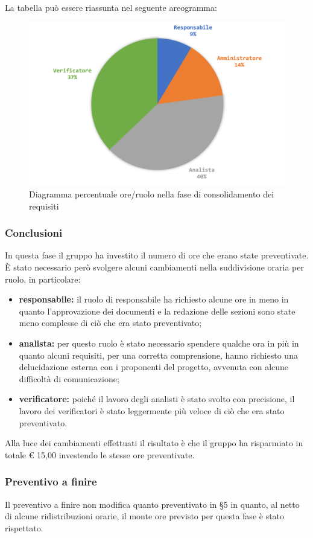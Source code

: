			La tabella può essere riassunta nel seguente areogramma:
			\begin{figure}[H]
				\centering
				\includegraphics[width=0.8\linewidth]{images/consuntivo/ConsReqCons2.png}
				\caption{Diagramma percentuale ore/ruolo nella fase di consolidamento dei requisiti}
				\label{fig:consuntivo diagramma costi ruolo fase di consolidamento dei requisiti}
			\end{figure}
		
		\subsubsection{Conclusioni }
			In questa fase il gruppo ha investito il numero di ore che erano state preventivate. È stato necessario però svolgere alcuni cambiamenti nella suddivisione oraria per ruolo, in particolare:
			\begin{itemize}
				\item \textbf{responsabile:} il ruolo di responsabile ha richiesto alcune ore in meno in quanto l'approvazione dei documenti e la redazione delle sezioni sono state meno complesse di ciò che era stato preventivato;
				\item \textbf{analista:} per questo ruolo è stato necessario spendere qualche ora in più in quanto alcuni requisiti, per una corretta comprensione, hanno richiesto una delucidazione esterna con i proponenti del progetto, avvenuta con alcune difficoltà di comunicazione;
				\item \textbf{verificatore:} poiché il lavoro degli analisti è stato svolto con precisione, il lavoro dei verificatori è stato leggermente più veloce di ciò che era stato preventivato.
			\end{itemize}
			Alla luce dei cambiamenti effettuati il risultato è che il gruppo ha risparmiato in totale € 15,00 investendo le stesse ore preventivate.
		\subsubsection{Preventivo a finire}
			Il preventivo a finire non modifica quanto preventivato in \S5 in quanto, al netto di alcune ridistribuzioni orarie, il monte ore previsto per questa fase è stato rispettato.
		\pagebreak

